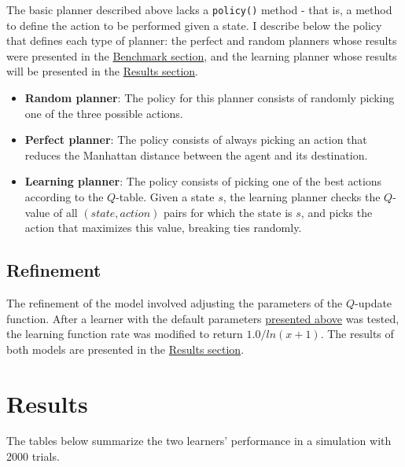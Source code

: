 \documentclass{article}
\begin{document}
The basic planner described above lacks a \texttt{policy()} method - that is, a method to define the action to be performed given a state. I describe below the policy that defines each type of planner: the perfect and random planners whose results were presented in the \hyperref[sec:benchmark]{Benchmark section}, and the learning planner whose results will be presented in the \hyperref[sec:results]{Results section}.

\begin{itemize}
    \item \textbf{Random planner}: The policy for this planner consists of randomly picking one of the three possible actions.
    \item \textbf{Perfect planner}: The policy consists of always picking an action that reduces the Manhattan distance between the agent and its destination.
    \item \textbf{Learning planner}: The policy consists of picking one of the best actions according to the $Q$-table. Given a state $s$, the learning planner checks the $Q$-value of all $(state, action)$ pairs for which the state is $s$, and picks the action that maximizes this value, breaking ties randomly.
\end{itemize}


\subsection{Refinement}

The refinement of the model involved adjusting the parameters of the $Q$-update function. After a learner with the default parameters  \hyperref[subsec:basic]{presented above} was tested, the learning function rate was modified to return $1.0 / ln(x + 1)$. The results of both models are presented in the \hyperref[sec:results]{Results section}.

\section{Results}
\label{sec:results}

The tables below summarize the two learners' performance in a simulation with 2000 trials.

\renewcommand{\arraystretch}{1.25}
\end{document}
